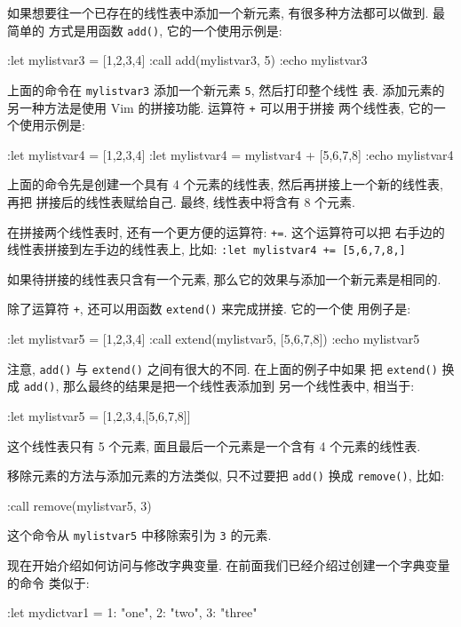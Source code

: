 如果想要往一个已存在的线性表中添加一个新元素, 有很多种方法都可以做到. 最简单的
方式是用函数 \texttt{add()}, 它的一个使用示例是:
\begin{vimcode}
:let mylistvar3 = [1,2,3,4]
:call add(mylistvar3, 5)
:echo mylistvar3
\end{vimcode}
上面的命令在 \texttt{mylistvar3} 添加一个新元素 \texttt{5}, 然后打印整个线性
表. 添加元素的另一种方法是使用 Vim 的拼接功能. 运算符 \texttt{+} 可以用于拼接
两个线性表, 它的一个使用示例是:
\begin{vimcode}
:let mylistvar4 = [1,2,3,4]
:let mylistvar4 = mylistvar4 + [5,6,7,8]
:echo mylistvar4
\end{vimcode}
上面的命令先是创建一个具有 4 个元素的线性表, 然后再拼接上一个新的线性表, 再把
拼接后的线性表赋给自己. 最终, 线性表中将含有 8 个元素.

\begin{warning}
    在拼接两个线性表时, 还有一个更方便的运算符: \texttt{+=}. 这个运算符可以把
    右手边的线性表拼接到左手边的线性表上, 比如: \texttt{:let mylistvar4 +=
    [5,6,7,8,]}
\end{warning}

如果待拼接的线性表只含有一个元素, 那么它的效果与添加一个新元素是相同的.

除了运算符 \texttt{+}, 还可以用函数 \texttt{extend()} 来完成拼接. 它的一个使
用例子是:
\begin{vimcode}
:let mylistvar5 = [1,2,3,4]
:call extend(mylistvar5, [5,6,7,8])
:echo mylistvar5
\end{vimcode}
注意, \texttt{add()} 与 \texttt{extend()} 之间有很大的不同. 在上面的例子中如果
把 \texttt{extend()} 换成 \texttt{add()}, 那么最终的结果是把一个线性表添加到
另一个线性表中, 相当于:
\begin{vimcode}
:let mylistvar5 = [1,2,3,4,[5,6,7,8]]
\end{vimcode}
这个线性表只有 5 个元素, 面且最后一个元素是一个含有 4 个元素的线性表.

移除元素的方法与添加元素的方法类似, 只不过要把 \texttt{add()} 换成
\texttt{remove()}, 比如:
\begin{vimcode}
:call remove(mylistvar5, 3)
\end{vimcode}
这个命令从 \texttt{mylistvar5} 中移除索引为 \texttt{3} 的元素.

现在开始介绍如何访问与修改字典变量. 在前面我们已经介绍过创建一个字典变量的命令
类似于:
\begin{vimcode}
:let mydictvar1 = {1: "one", 2: "two", 3: "three"}
\end{vimcode}


